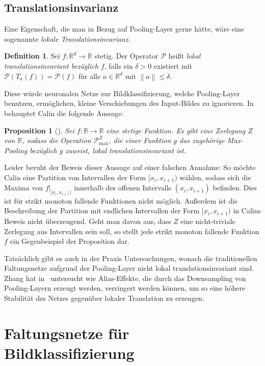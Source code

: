 \documentclass[paper=a4, 	%
		fontsize=11pt,
		abstract=true, 	%
		headsepline, 	%
		notitlepage	%
		]{scrartcl}
\newtheorem{proposition}[theorem]{Proposition}
\theoremstyle{definition}
\newtheorem{definition}[theorem]{Definition}
\newcommand{\R}{\mathbb{R}}
\newcommand{\norm}[1]{\left\lVert#1\right\rVert}
\begin{document}
\subsection{Translationsinvarianz}

Eine Eigenschaft, die man in Bezug auf Pooling-Layer gerne hätte, wäre eine sogenannte \emph{lokale Translationsinvarianz}.
\begin{definition}
    Sei $f: \R^d \rightarrow \R$ stetig.
    Der Operator $\mathcal{P}$ heißt \emph{lokal translationsinvariant bezüglich $f$}, falls ein $\delta > 0$ existiert mit $\mathcal{P} ( T_a ( f ) ) = \mathcal{P} ( f )$ für alle $a\in\R^d$ mit $\norm{a} \leq \delta$.
\end{definition}

Diese würde neuronalen Netze zur Bildklassifizierung, welche Pooling-Layer benutzen, er\-mög\-lichen, kleine Verschiebungen des Input-Bildes zu ignorieren.
In~\cite[Proposition~15.2.1]{Calin2020} behauptet Calin die folgende Aussage:
\begin{proposition}[{\cite[Proposition~15.2.1]{Calin2020}}]
    Sei $f: \R \rightarrow \R$ eine stetige Funktion.
    Es gibt eine Zerlegung $Z$ von $\R$, sodass die Operation $\mathcal{P}^Z_{\max}$, die einer Funktion $g$ das zugehörige Max-Pooling bezüglich $g$ zuweist, lokal translationsinvariant ist.
\end{proposition}

Leider beruht der Beweis dieser Aussage auf einer falschen Annahme:
So möchte Calin eine Partition von Intervallen der Form $[x_i, x_{i+1})$ wählen, sodass sich die Maxima von ${f}\vert_{[x_i, x_{i+1})}$ innerhalb des offenen Intervalls $(x_i, x_{i+1})$ befinden.
Dies ist für strikt monoton fallende Funktionen nicht möglich.
Außerdem ist die Beschreibung der Partition mit endlichen Intervallen der Form $[x_i, x_{i+1})$ in Calins Beweis nicht überzeugend.
Geht man davon aus, dass $Z$ eine nicht-triviale Zerlegung aus Intervallen sein soll, so stellt jede strikt monoton fallende Funktion $f$ ein Gegenbeispiel der Proposition dar.

Tatsächlich gibt es auch in der Praxis Untersuchungen, wonach die traditionellen Faltungsnetze aufgrund der Pooling-Layer nicht lokal translationsinvariant sind.
Zhang hat in~\cite{zhang2019shiftinvar} untersucht wie Alias-Effekte, die durch das Downsampling von Pooling-Layern erzeugt werden, verringert werden können, um so eine höhere Stabilität des Netzes gegenüber lokaler Translation zu erzeugen.


\section{Faltungsnetze für Bildklassifizierung}
\end{document}
